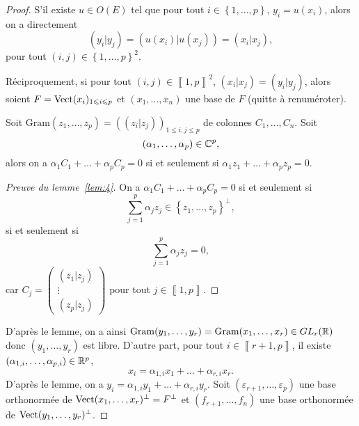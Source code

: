 \documentclass[12pt]{article}
\begin{document}
\begin{proof}
	S'il existe $u\in O(E)$ tel que pour tout $i\in\left\lbrace1,\dots,p\right\rbrace$, $y_i=u(x_i)$, alors on a directement 
	\begin{equation}
		(y_i|y_j)=(u(x_i)|u(x_j))=(x_i|x_j),
	\end{equation}
	pour tout $(i,j)\in\left\lbrace1,\dots,p\right\rbrace^{2}$.

	Réciproquement, si pour tout $(i,j)\in\left\llbracket1,p\right\rrbracket^{2}$, $(x_i|x_j)=(y_i|y_j)$, alors soient $F=\operatorname{Vect}(x_{i})_{1\leqslant i\leqslant p}$ et $(x_1,\dots,x_n)$ une base de $F$ (quitte à renuméroter).

	\begin{lemma}
		\label{lem:4}
		Soit $\mathrm{Gram}(z_1,\dots,z_p)=((z_i|z_j))_{1\leqslant i,j\leqslant p}$ de colonnes $C_1,\dots,C_n$. Soit 
		\begin{equation*}
			(\alpha_{1},\dots,\alpha_{p})\in\mathbb{C}^{p},
		\end{equation*}alors on a $\alpha_{1}C_1+\dots+\alpha_{p}C_p=0$ si et seulement si $\alpha_{1}z_{1}+\dots+\alpha_{p}z_{p}=0$.
	\end{lemma}
	\begin{proof}[Preuve du lemme~\ref{lem:4}]
		On a $\alpha_{1}C_{1}+\dots+\alpha_{p}C_{p}=0$ si et seulement si 
		\begin{equation*}
			\sum_{j=1}^{p}\alpha_{j}z_{j}\in\left\lbrace z_1,\dots,z_p\right\rbrace^{\perp},
		\end{equation*}si et seulement si 
		\begin{equation*}
			\sum_{j=1}^{p}\alpha_j z_j=0,
		\end{equation*} car $C_j=\begin{pmatrix}
			(z_1|z_j)\\\vdots\\(z_p|z_j)
		\end{pmatrix}$ pour tout $j\in\left\llbracket1,p\right\rrbracket$.
	\end{proof}

	D'après le lemme, on a ainsi $\mathrm{Gram}(y_1,\dots,y_r)=\mathrm{Gram}(x_1,\dots,x_r)\in GL_r(\mathbb{R})$ donc $(y_1,\dots,y_r)$ est libre. D'autre part, pour tout $i\in\left\llbracket r+1,p\right\rrbracket$, il existe $(\alpha_{1,i},\dots,\alpha_{p,i})\in\mathbb{R}^{p}$,
	\begin{equation}
		x_i=\alpha_{1,i}x_1+\dots+\alpha_{r,i}x_r.
	\end{equation}
	D'après le lemme, on a $y_i=\alpha_{1,i}y_1+\dots+\alpha_{r,i}y_r$. Soit $(\varepsilon_{r+1},\dots,\varepsilon_p)$ une base orthonormée de $\operatorname{Vect}(x_{1},\dots,x_r)^{\perp}=F^{\perp}$ et $(f_{r+1},\dots,f_{n})$ une base orthonormée de $\operatorname{Vect}(y_1,\dots,y_r)^{\perp}$.


\end{proof}
\end{document}
